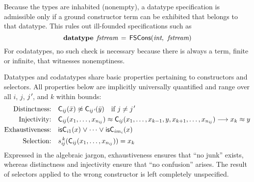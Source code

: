 Because the types are inhabited (nonempty), a datatype specification is
admissible only if a ground constructor term can be exhibited that belongs to
that datatype. This rules out ill-founded specifications such as
\[\textbf{datatype}\;\, \textit{fstream} \,=\, \textsf{FSCons}(\textit{int},\:\, \textit{fstream})\]
For codatatypes, no such check is necessary because there is always a term,
finite or infinite, that witnesses nonemptiness.
%
%

Datatypes and codatatypes share basic properties pertaining to constructors and
selectors. All properties below are implicitly universally quantified and range
over all $i$, $j$, $\jPrime$, and $k$ within bounds:
%
\[
\begin{aligned}[t]
\text{Distinctness:}\quad
  & %
    \const{C}_{i\negvthinspace j}(\bar x) \tneq \const{C}_{i\negvthinspace \jPrime}(\bar y) \quad\text{if $j \not= \jPrime$}
  \\
\text{Injectivity:}\quad
  & %
    \const{C}_{i\negvthinspace j}(x_1,\ldots,x_{n_{i\negvthinspace j}}) \teq \const{C}_{i\negvthinspace j}(x_1,\ldots,x_{k-1},y,x_{k+1},\ldots,x_{n_{i\negvthinspace j}}) \longrightarrow x_k \teq y
  \\
\text{Exhaustiveness:}\quad
  & \is{C}_{i1}(x) \mathrel\lor \cdots \mathrel\lor \is{C}_{im_i}(x)
  \\
\text{Selection:}\quad
  & s_{i\negvthinspace j}^{\,k}(\const{C}_{i\negvthinspace j}(x_1,\ldots,x_{n_{i\negvthinspace j}})) = x_k
\end{aligned}
\]
%
Expressed in the algebraic jargon, exhaustiveness ensures that ``no junk''
exists, whereas distinctness and injectivity ensure that ``no confusion''
arises. The result of selectors applied to the wrong constructor is left
completely unspecified.


